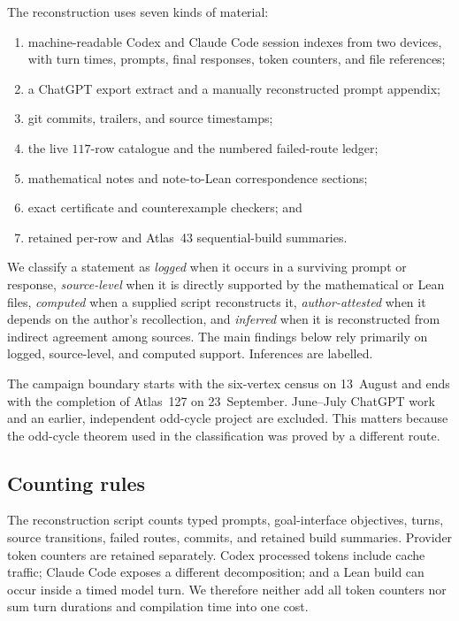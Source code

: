 \documentclass[11pt]{article}
\newcommand{\evidence}[1]{\textit{#1}}
\begin{document}
The reconstruction uses seven kinds of material:
\begin{enumerate}[leftmargin=2em]
 \item machine-readable Codex and Claude Code session indexes from two
 devices, with turn times, prompts, final responses, token counters, and file
 references;
 \item a ChatGPT export extract and a manually reconstructed prompt appendix;
 \item git commits, trailers, and source timestamps;
 \item the live $117$-row catalogue and the numbered failed-route ledger;
 \item mathematical notes and note-to-Lean correspondence sections;
 \item exact certificate and counterexample checkers; and
 \item retained per-row and Atlas~43 sequential-build summaries.
\end{enumerate}

We classify a statement as \evidence{logged} when it occurs in a surviving
prompt or response, \evidence{source-level} when it is directly supported by
the mathematical or Lean files, \evidence{computed} when a supplied script
reconstructs it, \evidence{author-attested} when it depends on the author's
recollection, and \evidence{inferred} when it is reconstructed from indirect
agreement among sources.  The main findings below rely primarily on logged,
source-level, and computed support.  Inferences are labelled.

The campaign boundary starts with the six-vertex census on 13~August and ends
with the completion of Atlas~127 on 23~September.  June--July ChatGPT work and
an earlier, independent odd-cycle project are excluded.  This matters because
the odd-cycle theorem used in the classification was proved by a different
route.

\subsection{Counting rules}

The reconstruction script counts typed prompts, goal-interface objectives,
turns, source transitions, failed routes, commits, and retained build
summaries.  Provider token counters are retained separately.  Codex processed
tokens include cache traffic; Claude Code exposes a different decomposition;
and a Lean build can occur inside a timed model turn.  We therefore neither
add all token counters nor sum turn durations and compilation time into one
cost.
\end{document}
